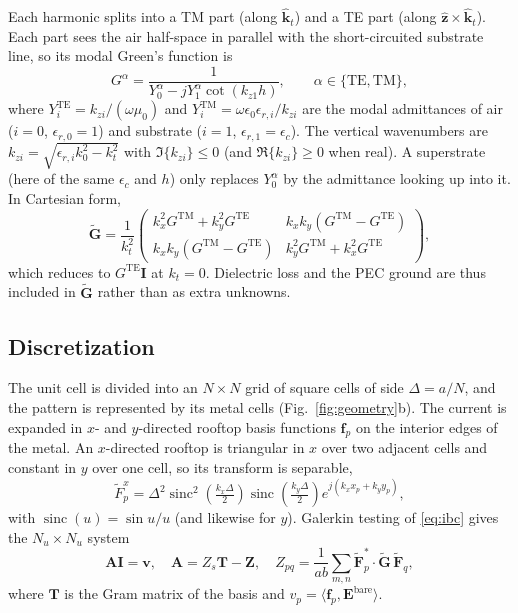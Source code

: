 \documentclass[10pt,conference]{IEEEtran}
\newcommand{\vect}[1]{\mathbf{#1}}
\newcommand{\Gt}{\tilde{\mathbf{G}}}
\DeclareMathOperator{\sinc}{sinc}
\begin{document}
	Each harmonic splits into a TM part (along $\hat{\vect{k}}_t$) and a TE part
	(along $\hat{\vect{z}}\times\hat{\vect{k}}_t$). Each part sees the air
	half-space in parallel with the short-circuited substrate line, so its modal
	Green's function is
	\begin{equation}
		G^{\alpha}=\frac{1}{Y^{\alpha}_0-jY^{\alpha}_1\cot(k_{z1}h)},
		\qquad \alpha\in\{\mathrm{TE},\mathrm{TM}\},
		\label{eq:gmodal}
	\end{equation}
	where $Y^{\mathrm{TE}}_i=k_{zi}/(\omega\mu_0)$ and
	$Y^{\mathrm{TM}}_i=\omega\epsilon_0\epsilon_{r,i}/k_{zi}$ are the modal
	admittances of air ($i=0$, $\epsilon_{r,0}=1$) and substrate ($i=1$,
	$\epsilon_{r,1}=\epsilon_c$). The vertical wavenumbers are
	$k_{zi}=\sqrt{\epsilon_{r,i}k_0^2-k_t^2}$ with $\Im\{k_{zi}\}\le0$
	(and $\Re\{k_{zi}\}\ge0$ when real). A superstrate (here of the same $\epsilon_c$
	and $h$) only replaces $Y^{\alpha}_0$ by the admittance looking up into it.
	In Cartesian form,
	\begin{equation}
		\Gt=\frac{1}{k_t^2}
		\begin{pmatrix}
			k_x^2G^{\mathrm{TM}}+k_y^2G^{\mathrm{TE}} & k_xk_y(G^{\mathrm{TM}}-G^{\mathrm{TE}})\\
			k_xk_y(G^{\mathrm{TM}}-G^{\mathrm{TE}}) & k_y^2G^{\mathrm{TM}}+k_x^2G^{\mathrm{TE}}
		\end{pmatrix},
		\label{eq:gdyad}
	\end{equation}
	which reduces to $G^{\mathrm{TE}}\mathbf{I}$ at $k_t=0$. Dielectric loss and
	the PEC ground are thus included in $\Gt$ rather than as extra unknowns.
	
	\subsection{Discretization}
	
	The unit cell is divided into an $N\times N$ grid of square cells of side
	$\Delta=a/N$, and the pattern is represented by its metal cells
	(Fig.~\ref{fig:geometry}b). The current is expanded in $x$- and $y$-directed
	rooftop basis functions $\vect{f}_p$ \cite{glisson1980} on the interior
	edges of the metal. An $x$-directed rooftop is triangular in $x$ over two
	adjacent cells and constant in $y$ over one cell, so its transform is
	separable,
	\begin{equation}
		\tilde{F}^x_p=\Delta^2\sinc^2\!\left(\tfrac{k_x\Delta}{2}\right)
		\sinc\!\left(\tfrac{k_y\Delta}{2}\right)e^{j(k_xx_p+k_yy_p)},
	\end{equation}
	with $\sinc(u)=\sin u/u$ (and likewise for $y$). Galerkin testing of
	\eqref{eq:ibc} gives the $N_u\times N_u$ system
	\begin{equation}
		\vect{A}\vect{I}=\vect{v},\quad \vect{A}=Z_s\vect{T}-\vect{Z},\quad
		Z_{pq}=\frac{1}{ab}\sum_{m,n}\tilde{\vect{F}}_p^{*}\cdot\Gt\,\tilde{\vect{F}}_q,
		\label{eq:system}
	\end{equation}
	where $\vect{T}$ is the Gram matrix of the basis and
	$v_p=\langle\vect{f}_p,\vect{E}^{\mathrm{bare}}\rangle$.
	
\end{document}
